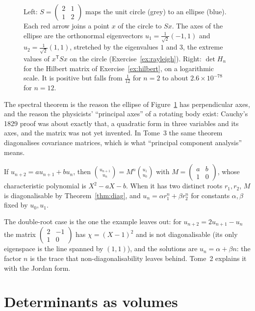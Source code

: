 \begin{figure}[ht]
\centering
{}
\caption{Left: $S=\begin{pmatrix}2&1\\1&2\end{pmatrix}$ maps the unit circle (grey) to an ellipse (blue). Each red arrow joins a point $x$ of the circle to $Sx$. The axes of the ellipse are the orthonormal eigenvectors $u_1=\frac1{\sqrt2}(-1,1)$ and $u_2=\frac1{\sqrt2}(1,1)$, stretched by the eigenvalues $1$ and $3$, the extreme values of $x^{\mathsf T}Sx$ on the circle (Exercise~\ref{ex:rayleigh}). Right: $\det H_n$ for the Hilbert matrix of Exercise~\ref{ex:hilbert}, on a logarithmic scale. It is positive but falls from $\frac1{12}$ for $n=2$ to about $2.6\times10^{-78}$ for $n=12$.}
\label{fig:ellipse}
\end{figure}

The spectral theorem is the reason the ellipse of Figure~\ref{fig:ellipse} has perpendicular axes, and the reason the physicists' ``principal axes'' of a rotating body exist: Cauchy's 1829 proof was about exactly that, a quadratic form in three variables and its axes, and the matrix was not yet invented. In Tome~3 the same theorem diagonalises covariance matrices, which is what ``principal component analysis'' means.

\begin{example}
If $u_{n+2}=au_{n+1}+bu_n$, then $\binom{u_{n+1}}{u_n}=M^n\binom{u_1}{u_0}$ with $M=\begin{pmatrix}a&b\\1&0\end{pmatrix}$, whose characteristic polynomial is $X^2-aX-b$.
When it has two distinct roots $r_1,r_2$, $M$ is diagonalisable by Theorem~\ref{thm:diag}, and $u_n=\alpha r_1^n+\beta r_2^n$ for constants $\alpha,\beta$ fixed by $u_0,u_1$.
\end{example}

The double-root case is the one the example leaves out: for $u_{n+2}=2u_{n+1}-u_n$ the matrix $\begin{pmatrix}2&-1\\1&0\end{pmatrix}$ has $\chi=(X-1)^2$ and is not diagonalisable (its only eigenspace is the line spanned by $(1,1)$), and the solutions are $u_n=\alpha+\beta n$: the factor $n$ is the trace that non-diagonalisability leaves behind. Tome~2 explains it with the Jordan form.

\section{Determinants as volumes}

